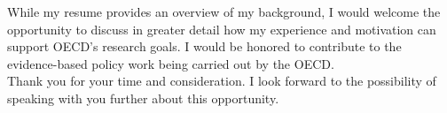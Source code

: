 \documentclass[11pt,a4paper,roman]{moderncv}
\begin{document}
\vspace{1em}
While my resume provides an overview of my background, I would welcome the opportunity to discuss in greater detail how my experience and motivation can support OECD's research goals. I would be honored to contribute to the evidence-based policy work being carried out by the OECD.\\

\vspace{1em}
Thank you for your time and consideration. I look forward to the possibility of speaking with you further about this opportunity.

\vspace{0.5cm}


\makeletterclosing
\end{document}
